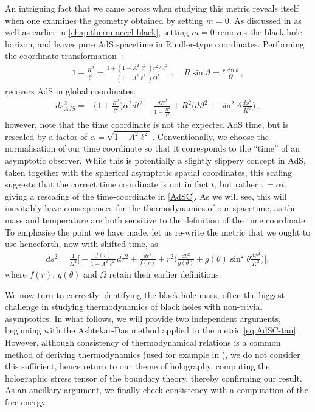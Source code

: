 \documentclass[
twoside,
openright,
frontopenright,
]{dmathesis}
\newcommand{\todoopt}[2][]{\todo[color=blue!20,size=\footnotesize,#1]{#2}}
\newcommand{\tcr}{\textcolor{red}}
\begin{document}
An intriguing fact that we came across when studying this metric reveals itself
when one examines the geometry obtained by setting $m=0$. As discussed in
\cite{Appels:2017xoe,Gregory:2017ogk} as well as earlier in
\cref{chap:therm-accel-black}, setting $m=0$ removes the black hole horizon, and
leaves pure AdS spacetime in Rindler-type coordinates.  Performing the
coordinate transformation~\cite{Podolsky:2002nk}:
\begin{align}
1+\frac{R^2}{\ell^2}=\frac{1+(1-A^2\ell^2)r^2/\ell^2}{(1-A^2\ell^2)\Omega^2}\,, \quad
R\sin\vartheta=\frac{r\sin\theta}{\Omega}\,,
\end{align}
recovers AdS in global coordinates:
\begin{align}
\label{gAdS}
 ds^2_{AdS}= -\Big(1+\frac{R^2}{\ell^2}\Big) \alpha^2
dt^2+\frac{dR^2}{1+\frac{R^2}{\ell^2}}  +R^2\Big(d\vartheta^2+\sin^2\vartheta
\frac{d\phi^2}{K^2}\Big)\,,
\end{align}
however, note that the time coordinate is not the expected AdS time, but is
rescaled by a factor of $\alpha = \sqrt{1-A^2 \ell^2}$. Conventionally, we
choose the normalisation of our time coordinate so that it corresponds to the
``time'' of an asymptotic observer. While this is potentially a slightly
slippery concept in AdS, taken together with the spherical asymptotic spatial
coordinates, this scaling suggests that the correct time coordinate is not in
fact $t$, but rather $\tau=\alpha t$, giving a rescaling of the time-coordinate
in \eqref{AdSC}. As we will see, this will inevitably have consequences for the
thermodynamics of our spacetime, as the mass and temperature are both sensitive
to the definition of the time coordinate. To emphasise the point we have made,
let us re-write the metric that we ought to use henceforth, now with shifted
time, as
\begin{align}\label{eq:AdSC-tau}
ds^2=\frac{1}{\Omega^2}\bigg[ -\frac{f(r)}{1-A^2\ell^2}d\tau^2+\frac{dr^2}{f(r)}
+r^2\Big(\frac{d\theta^2}{g(\theta)}
+g(\theta)\sin^2\theta\frac{d\phi^2}{K^2}\Big)\bigg],
\end{align}
where $f(r)$, $g(\theta)$ and $\Omega$ retain their earlier
definitions.\todoopt{insert KW metric?}

We now turn to correctly identifying the black hole mass, often the biggest
challenge in studying thermodynamics of black holes with non-trivial
asymptotics. In what follows, we will provide two independent
arguments, %
beginning with the Ashtekar-Das method \cite{Ashtekar:1999jx,Das:2000cu} applied
to the metric \eqref{eq:AdSC-tau}. However, although consistency of thermodynamical
relations is a common method of deriving thermodynamics (used for {example in
  \cite{Astorino:2016ybm}}), we do not consider this sufficient, hence return to
our theme of holography, computing the holographic stress tensor of the boundary
theory, thereby confirming our result.  As an ancillary argument, we finally
check consistency with a computation of the free energy.
\end{document}
